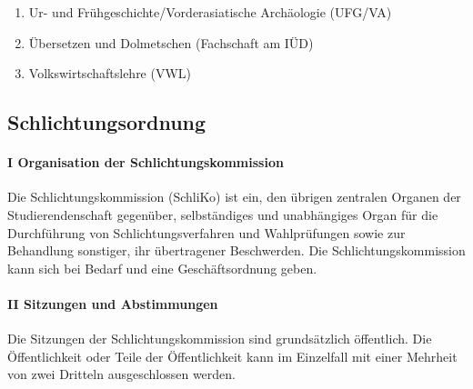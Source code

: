 \begin{enumerate}[noitemsep]
        \item Ur- und Frühgeschichte/Vorderasiatische Archäologie (UFG/VA)                                                                                                                                                \\
        \item Übersetzen und Dolmetschen (Fachschaft am IÜD)                                                                                                                                                              \\
        \item Volkswirtschaftslehre (VWL)
    \end{enumerate}
\subsection{Schlichtungsordnung}\label{appendix:3}
    \paragraph{I Organisation der Schlichtungskommission}
            Die Schlichtungskommission (SchliKo) ist ein, den übrigen zentralen Organen der Studierendenschaft gegenüber, selbständiges und unabhängiges Organ für die Durchführung von Schlichtungsverfahren und Wahlprüfungen sowie zur Behandlung sonstiger, ihr übertragener Beschwerden.
            Die Schlichtungskommission kann sich bei Bedarf und eine Geschäftsordnung geben.
    \paragraph{II Sitzungen und Abstimmungen}
            Die Sitzungen der Schlichtungskommission sind grundsätzlich öffentlich. Die Öffentlichkeit oder Teile der Öffentlichkeit kann im Einzelfall mit einer Mehrheit von zwei Dritteln ausgeschlossen werden.
